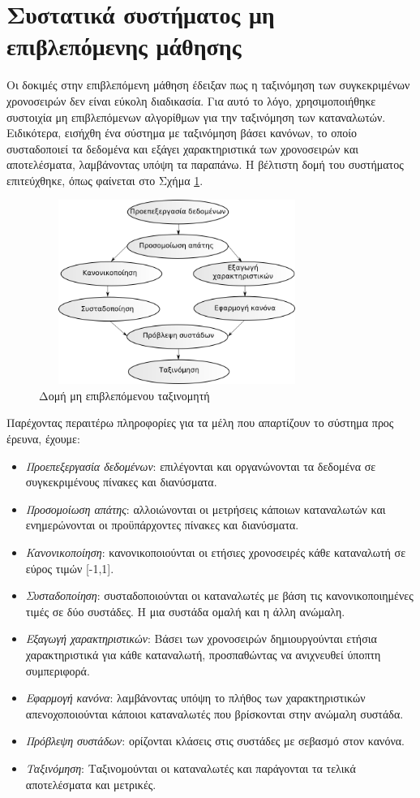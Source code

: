 \section{Συστατικά συστήματος μη επιβλεπόμενης μάθησης}
Οι δοκιμές στην επιβλεπόμενη μάθηση έδειξαν πως η ταξινόμηση των συγκεκριμένων χρονοσειρών δεν είναι εύκολη διαδικασία. Για αυτό το λόγο, χρησιμοποιήθηκε συστοιχία μη επιβλεπόμενων αλγορίθμων για την ταξινόμηση των καταναλωτών. Ειδικότερα, εισήχθη ένα σύστημα με ταξινόμηση βάσει κανόνων, το οποίο συσταδοποιεί τα δεδομένα και εξάγει χαρακτηριστικά των χρονοσειρών και αποτελέσματα, λαμβάνοντας υπόψη τα παραπάνω. Η βέλτιστη δομή του συστήματος επιτεύχθηκε, όπως φαίνεται στο Σχήμα \ref{fig:unsupervisedsystem}.\par
\begin{figure}[ht!]
\centering
 \includegraphics[width=90mm, height=60mm]{../../plots/systems/un_supervised.png}
 \caption{Δομή μη επιβλεπόμενου ταξινομητή}
\label{fig:unsupervisedsystem}
 \end{figure}
Παρέχοντας περαιτέρω πληροφορίες για τα μέλη που απαρτίζουν το σύστημα προς έρευνα, έχουμε:
\begin{itemize}
\item \textit{Προεπεξεργασία δεδομένων}: επιλέγονται και οργανώνονται τα δεδομένα σε συγκεκριμένους πίνακες και διανύσματα.
\item \textit{Προσομοίωση απάτης}: αλλοιώνονται οι μετρήσεις κάποιων καταναλωτών και ενημερώνονται οι προϋπάρχοντες πίνακες και διανύσματα.
\item \textit{Κανονικοποίηση}: κανονικοποιούνται οι ετήσιες χρονοσειρές κάθε καταναλωτή σε εύρος τιμών [-1,1].
\item \textit{Συσταδοποίηση}: συσταδοποιούνται οι καταναλωτές με βάση τις κανονικοποιημένες τιμές σε δύο συστάδες. Η μια συστάδα ομαλή και η άλλη ανώμαλη. 
\item \textit{Εξαγωγή χαρακτηριστικών}: Βάσει των χρονοσειρών δημιουργούνται ετήσια χαρακτηριστικά για κάθε καταναλωτή, προσπαθώντας να ανιχνευθεί ύποπτη συμπεριφορά.
\item \textit{Εφαρμογή κανόνα}: λαμβάνοντας υπόψη το πλήθος των χαρακτηριστικών απενοχοποιούνται κάποιοι καταναλωτές που βρίσκονται στην ανώμαλη συστάδα.
\item \textit{Πρόβλεψη συστάδων}: ορίζονται κλάσεις στις συστάδες με σεβασμό στον κανόνα.
\item \textit{Ταξινόμηση}: Ταξινομούνται οι καταναλωτές και παράγονται τα τελικά αποτελέσματα και μετρικές.
\end{itemize}

